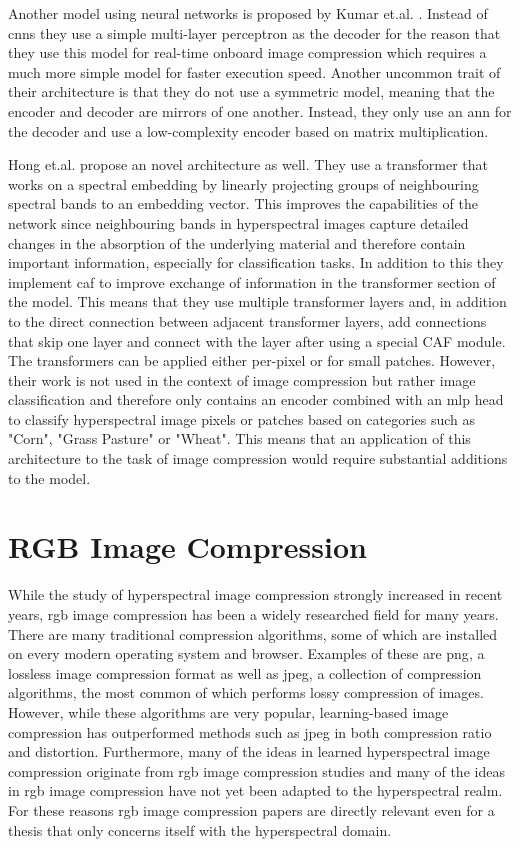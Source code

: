 Another model using neural networks is proposed by Kumar et.al. \citep{leal-taixe_onboard_2019}. Instead of \acp{cnn} they use a simple multi-layer perceptron as the decoder for the reason that they use this model for real-time onboard image compression which requires a much more simple model for faster execution speed. Another uncommon trait of their architecture is that they do not use a symmetric model, meaning that the encoder and decoder are mirrors of one another. Instead, they only use an \ac{ann} for the decoder and use a low-complexity encoder based on matrix multiplication.

Hong et.al. \citep{hong_spectralformer_2022} propose an novel architecture as well. They use a transformer that works on a spectral embedding by linearly projecting groups of neighbouring spectral bands to an embedding vector. This improves the capabilities of the network since neighbouring bands in hyperspectral images capture detailed changes in the absorption of the underlying material and therefore contain important information, especially for classification tasks.
In addition to this they implement \ac{caf} to improve exchange of information in the transformer section of the model. This means that they use multiple transformer layers and, in addition to the direct connection between adjacent transformer layers, add connections that skip one layer and connect with the layer after using a special CAF module.
The transformers can be applied either per-pixel or for small patches. However, their work is not used in the context of image compression but rather image classification and therefore only contains an encoder combined with an \ac{mlp} head to classify hyperspectral image pixels or patches based on categories such as "Corn", "Grass Pasture" or "Wheat". This means that an application of this architecture to the task of image compression would require substantial additions to the model. 
\section{RGB Image Compression \label{sec:ch2rgb}}
While the study of hyperspectral image compression strongly increased in recent years, \ac{rgb} image compression has been a widely researched field for many years. There are many traditional compression algorithms, some of which are installed on every modern operating system and browser. Examples of these are \ac{png}, a lossless image compression format as well as \ac{jpeg}, a collection of compression algorithms, the most common of which performs lossy compression of images.
However, while these algorithms are very popular, learning-based image compression has outperformed methods such as \ac{jpeg} in both compression ratio and distortion. Furthermore, many of the ideas in learned hyperspectral image compression originate from \ac{rgb} image compression studies and many of the ideas in \ac{rgb} image compression have not yet been adapted to the hyperspectral realm. For these reasons \ac{rgb} image compression papers are directly relevant even for a thesis that only concerns itself with the hyperspectral domain.
